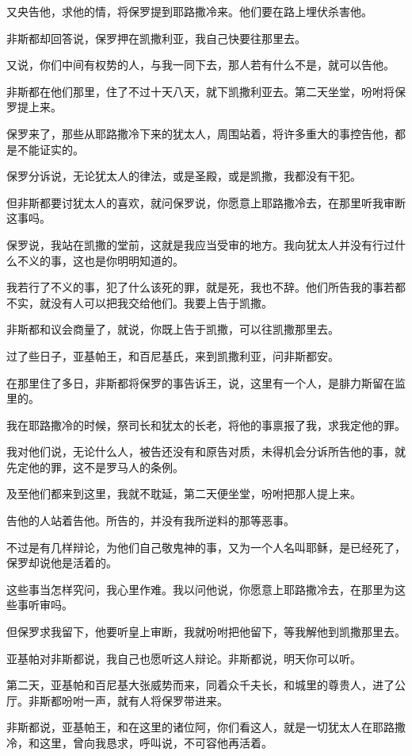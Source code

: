 \documentclass[12pt,oneside]{book}
\begin{document}
又央告他，求他的情，将保罗提到耶路撒冷来。他们要在路上埋伏杀害他。

非斯都却回答说，保罗押在凯撒利亚，我自己快要往那里去。

又说，你们中间有权势的人，与我一同下去，那人若有什么不是，就可以告他。

非斯都在他们那里，住了不过十天八天，就下凯撒利亚去。第二天坐堂，吩咐将保罗提上来。

保罗来了，那些从耶路撒冷下来的犹太人，周围站着，将许多重大的事控告他，都是不能证实的。

保罗分诉说，无论犹太人的律法，或是圣殿，或是凯撒，我都没有干犯。

但非斯都要讨犹太人的喜欢，就问保罗说，你愿意上耶路撒冷去，在那里听我审断这事吗。

保罗说，我站在凯撒的堂前，这就是我应当受审的地方。我向犹太人并没有行过什么不义的事，这也是你明明知道的。

我若行了不义的事，犯了什么该死的罪，就是死，我也不辞。他们所告我的事若都不实，就没有人可以把我交给他们。我要上告于凯撒。

非斯都和议会商量了，就说，你既上告于凯撒，可以往凯撒那里去。

过了些日子，亚基帕王，和百尼基氏，来到凯撒利亚，问非斯都安。

在那里住了多日，非斯都将保罗的事告诉王，说，这里有一个人，是腓力斯留在监里的。

我在耶路撒冷的时候，祭司长和犹太的长老，将他的事禀报了我，求我定他的罪。

我对他们说，无论什么人，被告还没有和原告对质，未得机会分诉所告他的事，就先定他的罪，这不是罗马人的条例。

及至他们都来到这里，我就不耽延，第二天便坐堂，吩咐把那人提上来。

告他的人站着告他。所告的，并没有我所逆料的那等恶事。

不过是有几样辩论，为他们自己敬鬼神的事，又为一个人名叫耶稣，是已经死了，保罗却说他是活着的。

这些事当怎样究问，我心里作难。我以问他说，你愿意上耶路撒冷去，在那里为这些事听审吗。

但保罗求我留下，他要听皇上审断，我就吩咐把他留下，等我解他到凯撒那里去。

亚基帕对非斯都说，我自己也愿听这人辩论。非斯都说，明天你可以听。

第二天，亚基帕和百尼基大张威势而来，同着众千夫长，和城里的尊贵人，进了公厅。非斯都吩咐一声，就有人将保罗带进来。

非斯都说，亚基帕王，和在这里的诸位阿，你们看这人，就是一切犹太人在耶路撒冷，和这里，曾向我恳求，呼叫说，不可容他再活着。
\end{document}
